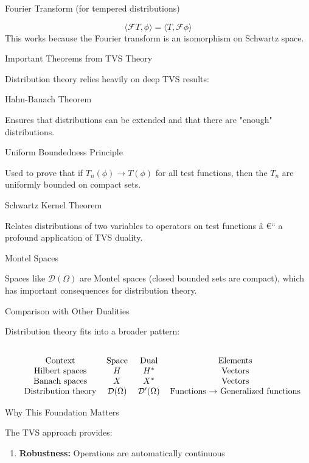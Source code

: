 \documentclass[aps,preprint]{revtex4}
\newenvironment{answer}
  {\begin{tcolorbox}[colback=green!5!white,colframe=green!75!black,title=Answer]}
  {\end{tcolorbox}}
\begin{document}
\begin{answer}
Fourier Transform (for tempered distributions)

\begin{equation*}
\langle \mathcal{F}T, \phi \rangle = \langle T, \mathcal{F}\phi \rangle
\end{equation*}
This works because the Fourier transform is an isomorphism on Schwartz space.

Important Theorems from TVS Theory

Distribution theory relies heavily on deep TVS results:

Hahn-Banach Theorem

Ensures that distributions can be extended and that there are "enough"
distributions.

Uniform Boundedness Principle

Used to prove that if $T_n(\phi) \to T(\phi)$ for all test functions, then
the $T_n$ are uniformly bounded on compact sets.

Schwartz Kernel Theorem

Relates distributions of two variables to operators on test functions \^{a}%
\euro `` a profound application of TVS duality.

Montel Spaces

Spaces like $\mathcal{D}(\Omega)$ are Montel spaces (closed bounded sets are
compact), which has important consequences for distribution theory.

Comparison with Other Dualities

Distribution theory fits into a broader pattern:%
\begin{eqnarray*}
&& \\
&&%
\begin{tabular}{cccc}
Context & Space & Dual & Elements \\ 
Hilbert spaces & $H$ & $H^{\ast }$ & Vectors \\ 
Banach spaces & $X$ & $X^{\ast }$ & Vectors \\ 
Distribution theory & $\mathcal{D}(\Omega )$ & $\mathcal{D}^{\prime }(\Omega
)$ & Functions $\rightarrow $ Generalized functions%
\end{tabular}%
\end{eqnarray*}

Why This Foundation Matters

The TVS approach provides:

\begin{enumerate}
\item \textbf{Robustness:} Operations are automatically continuous


\end{enumerate}
\end{answer}
\end{document}
